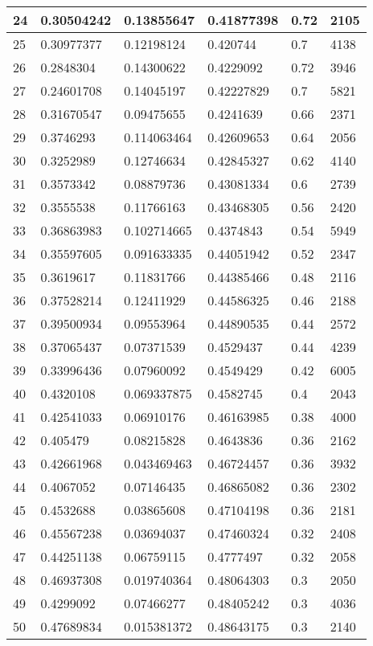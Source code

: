 \begin{longtable}{|l|l|l|l|l|l|}
24 & 0.30504242 & 0.13855647 & 0.41877398 & 0.72 & 2105 \\ \hline 
25 & 0.30977377 & 0.12198124 & 0.420744 & 0.7 & 4138 \\ \hline 
26 & 0.2848304 & 0.14300622 & 0.4229092 & 0.72 & 3946 \\ \hline 
27 & 0.24601708 & 0.14045197 & 0.42227829 & 0.7 & 5821 \\ \hline 
28 & 0.31670547 & 0.09475655 & 0.4241639 & 0.66 & 2371 \\ \hline 
29 & 0.3746293 & 0.114063464 & 0.42609653 & 0.64 & 2056 \\ \hline 
30 & 0.3252989 & 0.12746634 & 0.42845327 & 0.62 & 4140 \\ \hline 
31 & 0.3573342 & 0.08879736 & 0.43081334 & 0.6 & 2739 \\ \hline 
32 & 0.3555538 & 0.11766163 & 0.43468305 & 0.56 & 2420 \\ \hline 
33 & 0.36863983 & 0.102714665 & 0.4374843 & 0.54 & 5949 \\ \hline 
34 & 0.35597605 & 0.091633335 & 0.44051942 & 0.52 & 2347 \\ \hline 
35 & 0.3619617 & 0.11831766 & 0.44385466 & 0.48 & 2116 \\ \hline 
36 & 0.37528214 & 0.12411929 & 0.44586325 & 0.46 & 2188 \\ \hline 
37 & 0.39500934 & 0.09553964 & 0.44890535 & 0.44 & 2572 \\ \hline 
38 & 0.37065437 & 0.07371539 & 0.4529437 & 0.44 & 4239 \\ \hline 
39 & 0.33996436 & 0.07960092 & 0.4549429 & 0.42 & 6005 \\ \hline 
40 & 0.4320108 & 0.069337875 & 0.4582745 & 0.4 & 2043 \\ \hline 
41 & 0.42541033 & 0.06910176 & 0.46163985 & 0.38 & 4000 \\ \hline 
42 & 0.405479 & 0.08215828 & 0.4643836 & 0.36 & 2162 \\ \hline 
43 & 0.42661968 & 0.043469463 & 0.46724457 & 0.36 & 3932 \\ \hline 
44 & 0.4067052 & 0.07146435 & 0.46865082 & 0.36 & 2302 \\ \hline 
45 & 0.4532688 & 0.03865608 & 0.47104198 & 0.36 & 2181 \\ \hline 
46 & 0.45567238 & 0.03694037 & 0.47460324 & 0.32 & 2408 \\ \hline 
47 & 0.44251138 & 0.06759115 & 0.4777497 & 0.32 & 2058 \\ \hline 
48 & 0.46937308 & 0.019740364 & 0.48064303 & 0.3 & 2050 \\ \hline 
49 & 0.4299092 & 0.07466277 & 0.48405242 & 0.3 & 4036 \\ \hline 
50 & 0.47689834 & 0.015381372 & 0.48643175 & 0.3 & 2140 \\ \hline 
\end{longtable}